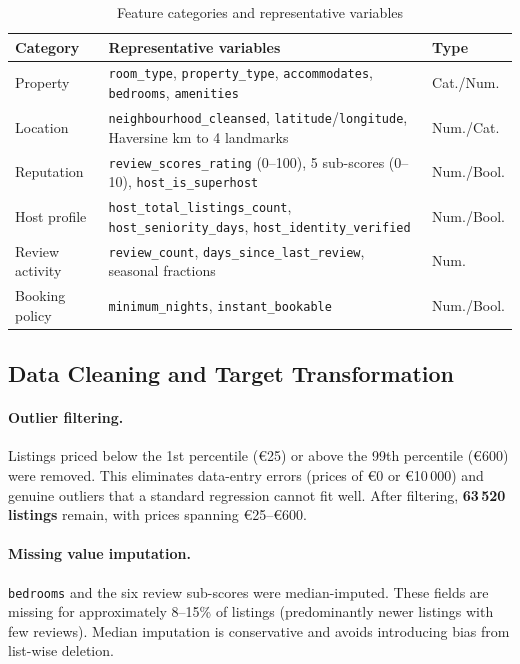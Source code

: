 \documentclass[12pt, a4paper]{article}
\begin{document}
\begin{table}[H]
  \centering
  \caption{Feature categories and representative variables}
  \label{tab:features}
  \small
  \begin{tabularx}{\textwidth}{lXl}
    \toprule
    \textbf{Category} & \textbf{Representative variables} & \textbf{Type} \\
    \midrule
    Property & \texttt{room\_type}, \texttt{property\_type}, \texttt{accommodates}, \texttt{bedrooms}, \texttt{amenities} & Cat./Num. \\
    Location & \texttt{neighbourhood\_cleansed}, \texttt{latitude}/\texttt{longitude}, Haversine km to 4 landmarks & Num./Cat. \\
    Reputation & \texttt{review\_scores\_rating} (0--100), 5 sub-scores (0--10), \texttt{host\_is\_superhost} & Num./Bool. \\
    Host profile & \texttt{host\_total\_listings\_count}, \texttt{host\_seniority\_days}, \texttt{host\_identity\_verified} & Num./Bool. \\
    Review activity & \texttt{review\_count}, \texttt{days\_since\_last\_review}, seasonal fractions & Num. \\
    Booking policy & \texttt{minimum\_nights}, \texttt{instant\_bookable} & Num./Bool. \\
    \bottomrule
  \end{tabularx}
\end{table}

\subsection{Data Cleaning and Target Transformation}

\paragraph{Outlier filtering.} Listings priced below the 1st percentile (\euro{}25) or above the 99th percentile (\euro{}600) were removed. This eliminates data-entry errors (prices of \euro{}0 or \euro{}10\,000) and genuine outliers that a standard regression cannot fit well. After filtering, \textbf{63\,520 listings} remain, with prices spanning \euro{}25--\euro{}600.

\paragraph{Missing value imputation.} \texttt{bedrooms} and the six review sub-scores were median-imputed. These fields are missing for approximately 8--15\% of listings (predominantly newer listings with few reviews). Median imputation is conservative and avoids introducing bias from list-wise deletion.
\end{document}
